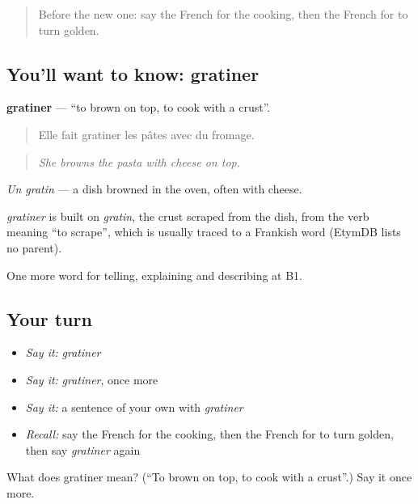 \label{lesson:FR-C331-gratiner}



\begin{quote}
Before the new one: say the French for the cooking, then the French for to turn golden.
\end{quote}

\subsection*{You'll want to know: gratiner}
\textbf{gratiner} — \textquotedblleft{}to brown on top, to cook with a crust\textquotedblright{}.

\begin{quote}
Elle fait gratiner les pâtes avec du fromage.
\end{quote}

\begin{quote}
\emph{She browns the pasta with cheese on top.}
\end{quote}

\emph{Un gratin} — a dish browned in the oven, often with cheese.

\begin{cousinweb}
\emph{gratiner} is built on \emph{gratin}, the crust scraped from the dish, from the verb meaning \textquotedblleft{}to scrape\textquotedblright{}, which is usually traced to a Frankish word (EtymDB lists no parent).
\end{cousinweb}

\begin{grammarlens}[title={What you've built}]
One more word for telling, explaining and describing at B1.
\end{grammarlens}

\subsection*{Your turn}
\begin{itemize}
\raggedright
  \item \emph{Say it:} \emph{gratiner}
  \item \emph{Say it:} \emph{gratiner}, once more
  \item \emph{Say it:} a sentence of your own with \emph{gratiner}
  \item \emph{Recall:} say the French for the cooking, then the French for to turn golden, then say \emph{gratiner} again
\end{itemize}

\begin{tcolorbox}[breakable,colback=teal!4,colframe=teal!35!black,title={Before you move on}]
What does gratiner mean? (\textquotedblleft{}To brown on top, to cook with a crust\textquotedblright{}.) Say it once more.
\end{tcolorbox}
